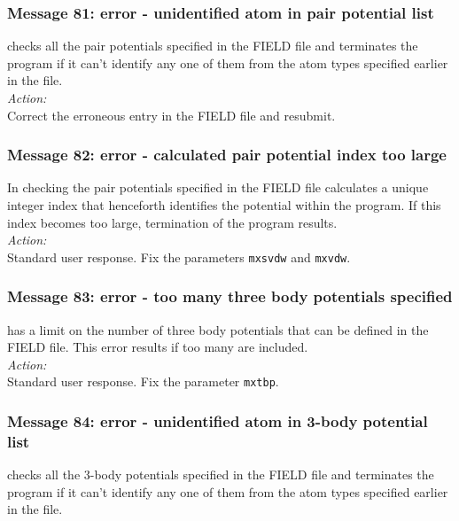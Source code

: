 \subsubsection*{Message 81: error - unidentified atom in pair potential list}

\D{} checks all the pair potentials specified in the FIELD file
and terminates the program if it can't identify any one of them from
the atom types specified earlier in the file. \\ 

\noindent
{\em Action:} \\ 
Correct the erroneous entry in the FIELD file and resubmit.

\subsubsection*{Message 82: error - calculated pair potential index too large}

In checking the pair potentials specified in the FIELD file \D{}
calculates a unique integer index that henceforth identifies the
potential within the program. If this index becomes too large,
termination of the program results. \\ 

\noindent
{\em Action:} \\ 
Standard user response. Fix the parameters {\tt mxsvdw} and {\tt mxvdw}.

\subsubsection*{Message 83: error - too many three
body  potentials
specified}

\D{} has a limit on the number of three body potentials that
can be defined in the FIELD file. This error results if too many are
included. \\

\noindent
{\em Action:} \\
Standard user response. Fix the parameter {\tt mxtbp}.

\subsubsection*{Message 84: error - unidentified atom in 3-body potential list}

\D{} checks all the 3-body  potentials specified in the FIELD file
and terminates the program if it can't identify any one of them from
the atom types specified earlier in the file. \\ 

